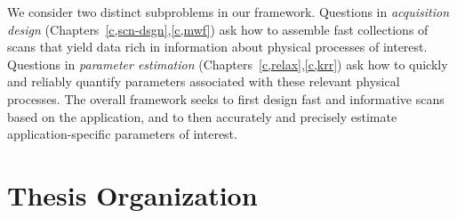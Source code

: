 We consider two distinct subproblems in our framework.
Questions in \emph{acquisition design}
(Chapters~\ref{c,scn-dsgn},\ref{c,mwf})
ask how to assemble 
fast collections of scans
that yield data 
rich in information 
about physical processes of interest.
Questions in \emph{parameter estimation}
(Chapters~\ref{c,relax},\ref{c,krr})
ask how to quickly and reliably quantify parameters 
associated with these relevant physical processes.
The overall framework seeks to
first design fast and informative scans 
based on the application,
and to then accurately and precisely estimate 
application-specific parameters of interest.
 
\section{Thesis Organization}
\label{s,intro,org}

